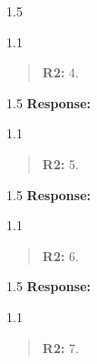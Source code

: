 \documentclass[12pt,english]{article}
\newcommand{\rrquote}{1.1}
\newcommand{\rrxspc}{1.5}
\begin{document}
\begin{refsection}
\begin{spacing}{\rrxspc}

    \end{spacing}

    \begin{spacing}{\rrquote}
        \begin{quotation}
        \textbf{R2: } 4. 
        \end{quotation}
        \end{spacing}
        
        \begin{spacing}{\rrxspc}
            \textbf{Response:} 
    \end{spacing}

    \begin{spacing}{\rrquote}
        \begin{quotation}
        \textbf{R2: } 5. 
        \end{quotation}
        \end{spacing}
        
        \begin{spacing}{\rrxspc}
            \textbf{Response:} 
    \end{spacing}

    \begin{spacing}{\rrquote}
        \begin{quotation}
        \textbf{R2: } 6. 
        \end{quotation}
        \end{spacing}
        
        \begin{spacing}{\rrxspc}
           \textbf{Response:}  
    \end{spacing}

    \begin{spacing}{\rrquote}
        \begin{quotation}
        \textbf{R2: } 7. 
        \end{quotation}
        \end{spacing}
        

\end{refsection}
\end{document}
